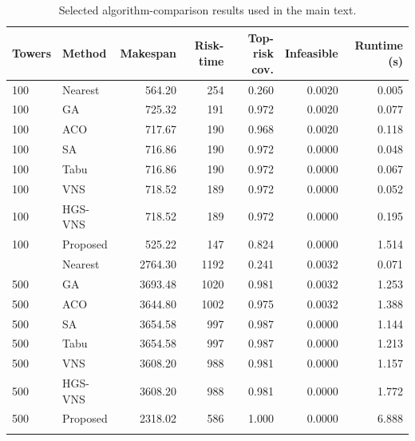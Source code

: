 \begin{table}[t]
\centering
\caption{Selected algorithm-comparison results used in the main text.}
\label{tab:algorithm-results}
\footnotesize
\begin{tabular}{@{}llrrrrr@{}}
\toprule
Towers & Method & Makespan & Risk-time & Top-risk cov. & Infeasible & Runtime (s) \\
\midrule
100 & Nearest & 564.20 & 254 & 0.260 & 0.0020 & 0.005 \\
100 & GA & 725.32 & 191 & 0.972 & 0.0020 & 0.077 \\
100 & ACO & 717.67 & 190 & 0.968 & 0.0020 & 0.118 \\
100 & SA & 716.86 & 190 & 0.972 & 0.0000 & 0.048 \\
100 & Tabu & 716.86 & 190 & 0.972 & 0.0000 & 0.067 \\
100 & VNS & 718.52 & 189 & 0.972 & 0.0000 & 0.052 \\
100 & HGS-VNS & 718.52 & 189 & 0.972 & 0.0000 & 0.195 \\
100 & Proposed & 525.22 & 147 & 0.824 & 0.0000 & 1.514 \\
\addlinespace[2pt]
500 & Nearest & 2764.30 & 1192 & 0.241 & 0.0032 & 0.071 \\
500 & GA & 3693.48 & 1020 & 0.981 & 0.0032 & 1.253 \\
500 & ACO & 3644.80 & 1002 & 0.975 & 0.0032 & 1.388 \\
500 & SA & 3654.58 & 997 & 0.987 & 0.0000 & 1.144 \\
500 & Tabu & 3654.58 & 997 & 0.987 & 0.0000 & 1.213 \\
500 & VNS & 3608.20 & 988 & 0.981 & 0.0000 & 1.157 \\
500 & HGS-VNS & 3608.20 & 988 & 0.981 & 0.0000 & 1.772 \\
500 & Proposed & 2318.02 & 586 & 1.000 & 0.0000 & 6.888 \\
\addlinespace[2pt]
\bottomrule
\end{tabular}
\end{table}

